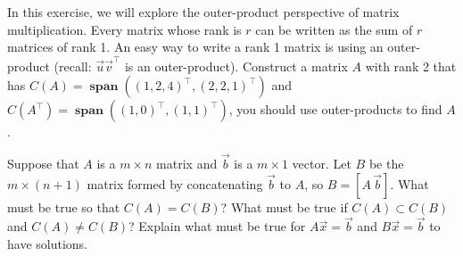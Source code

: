 \documentclass[]{exam}
\begin{document}
\begin{questions}
	\question In this exercise, we will explore the outer-product perspective of matrix multiplication. Every matrix whose rank is $r$ can be written as the sum of $r$ matrices of rank 1. An easy way to write a rank 1 matrix is using an outer-product (recall: $\vec{u}\vec{v}^\intercal$ is an outer-product). Construct a matrix $A$ with rank 2 that has $C(A) = \mathop{\mathbf{span}}((1,2,4)^\intercal, (2,2,1)^\intercal)$ and $C(A^\intercal) = \mathop{\mathbf{span}}((1,0)^\intercal,(1,1)^\intercal)$, you should use outer-products to find $A$.
	
\begin{solution}
    
\end{solution}
	
	\question Suppose that $A$ is a $m \times n$ matrix and $\vec{b}$ is a $m \times 1$ vector. Let $B$ be the $m \times (n+1)$ matrix formed by concatenating $\vec{b}$ to $A$, so $B = [A \, \vec{b}]$. What must be true so that $C(A)=C(B)$? What must be true if $C(A) \subset C(B)$ and $C(A) \ne C(B)$? Explain what must be true for $A \vec{x} = \vec{b}$ and $B \vec{x} = \vec{b}$ to have solutions. 
	
	
	\begin{solution}
        
	\end{solution}
	
\end{questions}
\end{document}

